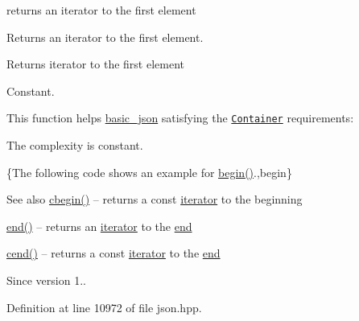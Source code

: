 returns an iterator to the first element 

Returns an iterator to the first element.

 \begin{DoxyReturn}{Returns}
iterator to the first element
\end{DoxyReturn}
Constant.

This function helps {\ttfamily \hyperlink{classnlohmann_1_1basic__json}{basic\+\_\+json}} satisfying the \href{http://en.cppreference.com/w/cpp/concept/Container}{\tt Container} requirements\+:
\begin{DoxyItemize}
\item The complexity is constant.
\end{DoxyItemize}

\{The following code shows an example for {\ttfamily \hyperlink{classnlohmann_1_1basic__json_a0ff28dac23f2bdecee9564d07f51dcdc}{begin()}}.,begin\}

\begin{DoxySeeAlso}{See also}
\hyperlink{classnlohmann_1_1basic__json_ad865d6c291b237ae508d5cb2146b5877}{cbegin()} -- returns a const \hyperlink{classnlohmann_1_1basic__json_a099316232c76c034030a38faa6e34dca}{iterator} to the beginning 

\hyperlink{classnlohmann_1_1basic__json_a13e032a02a7fd8a93fdddc2fcbc4763c}{end()} -- returns an \hyperlink{classnlohmann_1_1basic__json_a099316232c76c034030a38faa6e34dca}{iterator} to the \hyperlink{classnlohmann_1_1basic__json_a13e032a02a7fd8a93fdddc2fcbc4763c}{end} 

\hyperlink{classnlohmann_1_1basic__json_a8dba7b7d2f38e6b0c614030aa43983f6}{cend()} -- returns a const \hyperlink{classnlohmann_1_1basic__json_a099316232c76c034030a38faa6e34dca}{iterator} to the \hyperlink{classnlohmann_1_1basic__json_a13e032a02a7fd8a93fdddc2fcbc4763c}{end}
\end{DoxySeeAlso}
\begin{DoxySince}{Since}
version 1.. 
\end{DoxySince}


Definition at line 10972 of file json.\+hpp.

